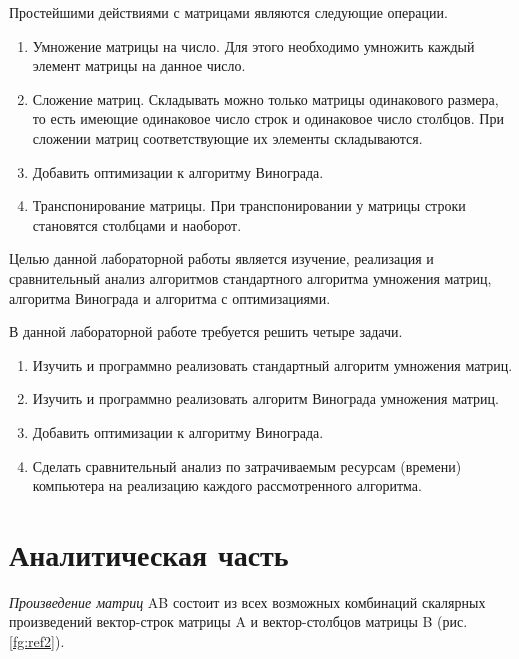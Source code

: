 \documentclass[12pt]{report}
\begin{document}
Простейшими действиями с матрицами являются следующие операции.

\begin{enumerate}
  	\item Умножение матрицы на число. Для этого необходимо умножить каждый элемент матрицы на данное число.
	\item Сложение матриц. Складывать можно только матрицы одинакового размера, то есть имеющие одинаковое число строк и одинаковое число столбцов. При сложении матриц соответствующие их элементы складываются.
	\item Добавить оптимизации к алгоритму Винограда.
	\item Транспонирование матрицы. При транспонировании у матрицы строки становятся столбцами и наоборот.
\end{enumerate}

	Целью данной лабораторной работы является изучение, реализация и сравнительный анализ алгоритмов
стандартного алгоритма умножения матриц, алгоритма Винограда и алгоритма с оптимизациями. 

В данной лабораторной работе требуется решить четыре задачи.
\begin{enumerate}
  	\item Изучить и программно реализовать стандартный алгоритм умножения матриц.
	\item Изучить и программно реализовать алгоритм Винограда умножения матриц.
	\item Добавить оптимизации к алгоритму Винограда.
	\item Сделать сравнительный анализ по затрачиваемым ресурсам (времени) компьютера на реализацию каждого рассмотренного алгоритма.
\end{enumerate}


\chapter{Аналитическая часть}
\textit{Произведение матриц} AB состоит из всех возможных комбинаций скалярных произведений 
вектор-строк матрицы A и вектор-столбцов матрицы B (рис. \ref{fg:ref2}).

\begin{figure}[ht!]
\end{figure}
\end{document}
